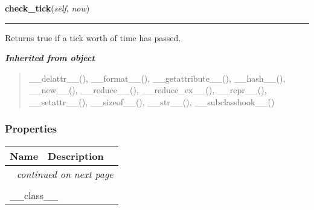     \label{pygame-asteroids:tools:Timer:check_tick}

    \vspace{0.5ex}

\hspace{.8\funcindent}\begin{boxedminipage}{\funcwidth}

    \raggedright \textbf{check\_tick}(\textit{self}, \textit{now})

    \vspace{-1.5ex}

    \rule{\textwidth}{0.5\fboxrule}
\setlength{\parskip}{2ex}
    Returns true if a tick worth of time has passed.

\setlength{\parskip}{1ex}
    \end{boxedminipage}


\large{\textbf{\textit{Inherited from object}}}

\begin{quote}
\_\_delattr\_\_(), \_\_format\_\_(), \_\_getattribute\_\_(), \_\_hash\_\_(), \_\_new\_\_(), \_\_reduce\_\_(), \_\_reduce\_ex\_\_(), \_\_repr\_\_(), \_\_setattr\_\_(), \_\_sizeof\_\_(), \_\_str\_\_(), \_\_subclasshook\_\_()
\end{quote}


  \subsubsection{Properties}

    \vspace{-1cm}
\hspace{\varindent}\begin{longtable}{|p{\varnamewidth}|p{\vardescrwidth}|l}
\cline{1-2}
\cline{1-2} \centering \textbf{Name} & \centering \textbf{Description}& \\
\cline{1-2}
\endhead\cline{1-2}\multicolumn{3}{r}{\small\textit{continued on next page}}\\\endfoot\cline{1-2}
\endlastfoot\multicolumn{2}{|l|}{\textit{Inherited from object}}\\
\multicolumn{2}{|p{\varwidth}|}{\raggedright \_\_class\_\_}\\
\cline{1-2}
\end{longtable}

